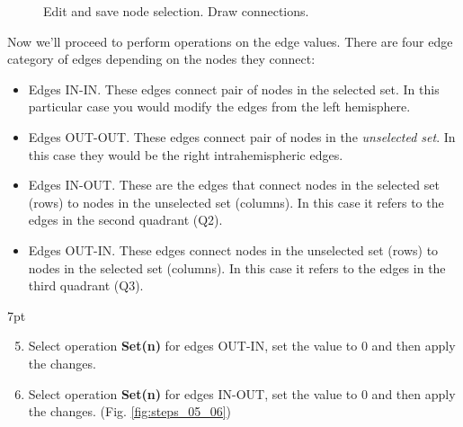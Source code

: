 \documentclass{tufte-handout}
\newenvironment{formal}{%
  \def\FrameCommand{%
    \hspace{1pt}%
    {\color{DarkBlue}\vrule width 2pt}%
    {\color{formalshade}\vrule width 4pt}%
    \colorbox{formalshade}%
  }%
  \MakeFramed{\advance\hsize-\width\FrameRestore}%
  \noindent\hspace{-4.55pt}%
  \begin{adjustwidth}{}{7pt}%
  \vspace{2pt}\vspace{2pt}%
}
{%
  \vspace{2pt}\end{adjustwidth}\endMakeFramed%
}
\begin{document}
\begin{figure}
  \caption{Edit and save node selection. Draw connections.}
  \label{fig:steps_01_02_03_04}
\end{figure}


\noindent Now we'll proceed to perform operations on the edge values. There are four
edge category of edges depending on the nodes they connect:

\begin{itemize}
  \item Edges IN-IN. These edges connect pair of nodes in the selected set. In this
  particular case you would modify the edges from the left hemisphere.
  \item Edges OUT-OUT. These edges connect pair of nodes in the \textit{unselected
  set}. In this case they would be the right intrahemispheric edges.
  \item Edges IN-OUT. These are the edges that connect nodes in the selected set
  (rows) to nodes in the unselected set (columns). In this case it refers to
  the edges in the second quadrant (Q2).
  \item Edges OUT-IN. These edges connect nodes in the unselected set (rows) to
  nodes in the selected set (columns). In this case it refers to the edges in the third
  quadrant (Q3).
\end{itemize}

\begin{formal}
  \begin{enumerate}[resume]
  \setcounter{enumi}{4}
  \item Select operation \textbf{Set(n)} for edges OUT-IN, set the value to 0 and then apply the changes. 
  \item Select operation \textbf{Set(n)} for edges IN-OUT, set the value to 0 and then apply the changes. (Fig. \ref{fig:steps_05_06})
  \end{enumerate}
\end{formal}
\end{document}
